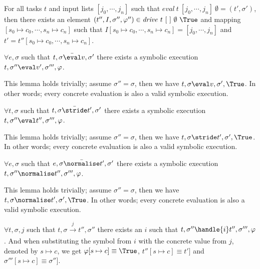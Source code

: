 \begin{theorem}
For all tasks $t$ and input lists $[j_0,\cdots,j_n]$ such that $\mathit{eval}\ t\ [j_0,\cdots,j_n]\ \emptyset = (t',\sigma')$,
then there exists an element $(t'',I,\sigma'',\phi'')\in \mathit{drive}\ t\ [\ ]\ \emptyset\ \True$ and mapping $[s_0\mapsto c_0,\cdots,s_n\mapsto c_n]$ such that
$I[s_0\mapsto c_0,\cdots,s_n\mapsto c_n]=[j_0,\cdots,j_n]$ and $t'=t''[s_0\mapsto c_0,\cdots,s_n\mapsto c_n]$.
  \label{thm:complete}
\end{theorem}


\begin{lemma}
  $\forall e,\sigma$ such that $t,\sigma \bar{\eval}v,\sigma'$
  there exists a symbolic execution $t,\sigma''\eval v',\sigma''',\phi$.
\end{lemma}

This lemma holds trivially; assume $\sigma''=\sigma$, then we have $t,\sigma\eval v,\sigma',\True$. In other words; every concrete evaluation is also a valid symbolic execution.

\begin{lemma}
  $\forall t,\sigma$ such that $t,\sigma \bar{\stride}t',\sigma'$
  there exists a symbolic execution $t,\sigma''\eval t'',\sigma''',\phi$.
\end{lemma}

This lemma holds trivially; assume $\sigma''=\sigma$, then we have $t,\sigma\stride t',\sigma',\True$. In other words; every concrete evaluation is also a valid symbolic execution.

\begin{lemma}
  $\forall e,\sigma$ such that $e,\sigma \bar{\normalise}t',\sigma'$
  there exists a symbolic execution $t,\sigma''\normalise t'',\sigma''',\phi$.
\end{lemma}

This lemma holds trivially; assume $\sigma''=\sigma$, then we have $t,\sigma\normalise t',\sigma',\True$. In other words; every concrete evaluation is also a valid symbolic execution.

\begin{lemma}
  $\forall t,\sigma,j$ such that $t,\sigma \xrightarrow[]{j} t'',\sigma''$
  there exists an $i$ such that $t,\sigma''\handle{i} t'',\sigma''',\phi$. And when substituting the symbol from $i$ with the concrete value from $j$, denoted by $s\mapsto c$, we get $\phi[s\mapsto c]\equiv\True$, $t''[s\mapsto c]\equiv t']$ and $\sigma'''[s\mapsto c]\equiv\sigma'']$.
\end{lemma}

\begin{lemma}
\end{lemma}

